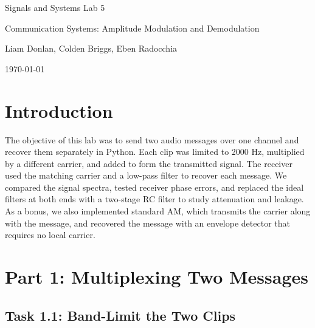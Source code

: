 \documentclass[11pt,a4paper]{article}
\begin{document}
\begin{titlepage}
    \vspace*{2cm}
    \centering
    {\huge Signals and Systems Lab 5\par}
    \vspace{0.5cm}
    {\Large Communication Systems: Amplitude Modulation and Demodulation\par}
    \vspace{0.5cm}
    {\large Liam Donlan, Colden Briggs, Eben Radocchia\par}
    \vspace{0.3cm}
    {\large \today\par}
\end{titlepage}

\tableofcontents
\newpage

\section{Introduction}

The objective of this lab was to send two audio messages over one channel and recover them separately in Python. Each clip was limited to 2000 Hz, multiplied by a different carrier, and added to form the transmitted signal. The receiver used the matching carrier and a low-pass filter to recover each message. We compared the signal spectra, tested receiver phase errors, and replaced the ideal filters at both ends with a two-stage RC filter to study attenuation and leakage. As a bonus, we also implemented standard AM, which transmits the carrier along with the message, and recovered the message with an envelope detector that requires no local carrier.

\section{Part 1: Multiplexing Two Messages}

\subsection{Task 1.1: Band-Limit the Two Clips}
\end{document}
